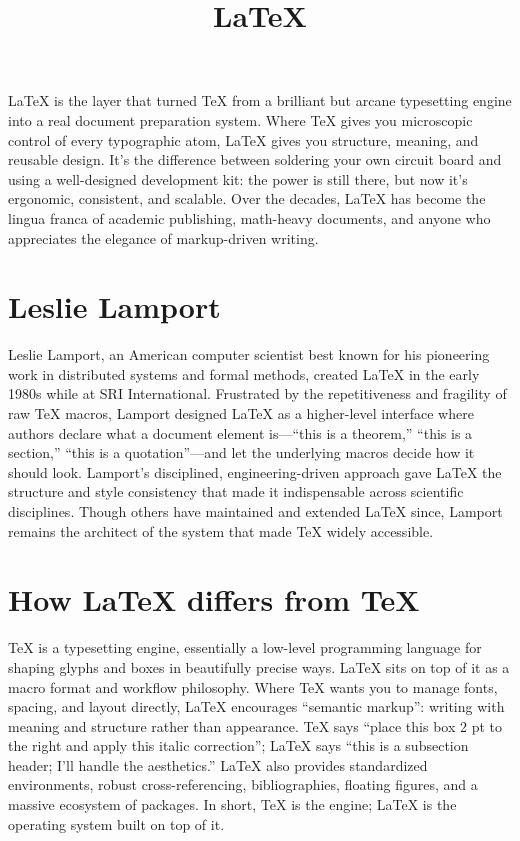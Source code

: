 \documentclass[a4paper,twoside]{article}
\title{\LaTeX{}}
\author{}\date{}
\begin{document}
\maketitle
\LaTeX{} is the layer that turned \TeX{} from a brilliant but arcane typesetting engine into a real document preparation system. Where \TeX{} gives you microscopic control of every typographic atom, \LaTeX{} gives you structure, meaning, and reusable design. It's the difference between soldering your own circuit board and using a well-designed development kit: the power is still there, but now it's ergonomic, consistent, and scalable. Over the decades, \LaTeX{} has become the lingua franca of academic publishing, math-heavy documents, and anyone who appreciates the elegance of markup-driven writing.
\section{Leslie Lamport}
Leslie Lamport, an American computer scientist best known for his pioneering work in distributed systems and formal methods, created \LaTeX{} in the early 1980s while at SRI International. Frustrated by the repetitiveness and fragility of raw \TeX{} macros, Lamport designed \LaTeX{} as a higher-level interface where authors declare what a document element is---\enquote{this is a theorem,} \enquote{this is a section,} \enquote{this is a quotation}---and let the underlying macros decide how it should look. Lamport's disciplined, engineering-driven approach gave \LaTeX{} the structure and style consistency that made it indispensable across scientific disciplines. Though others have maintained and extended \LaTeX{} since, Lamport remains the architect of the system that made \TeX{} widely accessible.
\section{How \LaTeX{} differs from \TeX{}}
\TeX{} is a typesetting engine, essentially a low-level programming language for shaping glyphs and boxes in beautifully precise ways. \LaTeX{} sits on top of it as a macro format and workflow philosophy. Where \TeX{} wants you to manage fonts, spacing, and layout directly, \LaTeX{} encourages \enquote{semantic markup}: writing with meaning and structure rather than appearance. \TeX{} says \enquote{place this box 2 pt to the right and apply this italic correction}; \LaTeX{} says \enquote{this is a subsection header; I'll handle the aesthetics.} \LaTeX{} also provides standardized environments, robust cross-referencing, bibliographies, floating figures, and a massive ecosystem of packages. In short, \TeX{} is the engine; \LaTeX{} is the operating system built on top of it.
\end{document}
